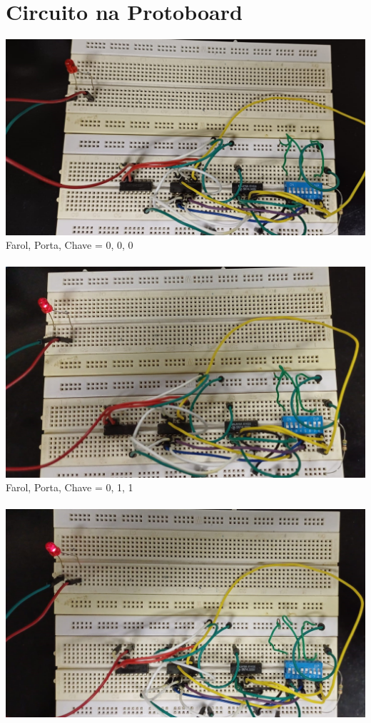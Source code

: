\documentclass[]{article}
\begin{document}
	\section{Circuito na Protoboard}
		\includegraphics[scale=0.25]{Images/Protoboard 000.jpg} \\
		Farol, Porta, Chave = {0, 0, 0} \\ \\
		\includegraphics[scale=0.263]{Images/Protoboard 011.jpg} \\
		Farol, Porta, Chave = {0, 1, 1} \\ \\
		\includegraphics[scale=0.25]{Images/Protoboard 110.jpg} \\
\end{document}
